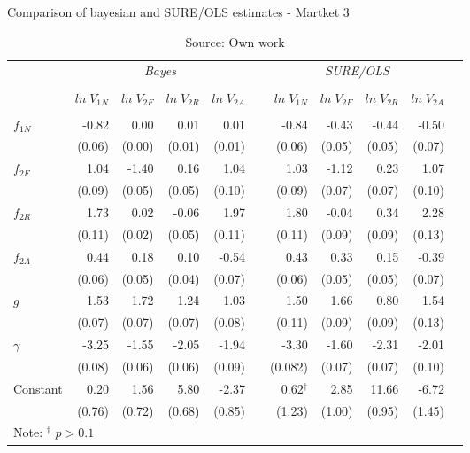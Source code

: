 \begin{table} [H]
\caption{Comparison of bayesian and SURE/OLS estimates - Martket 3}
\label{tbl:mkt3_T_SCOTYORK}
\centering
\begin{tabular}{lrrrrrrrrrr}
  \toprule 
 & \multicolumn{4}{c}{\textit{Bayes}} && \multicolumn{4}{c}{\textit{SURE/OLS}} \\ 
\cline{2-5} \cline{7-10} 
\\[-1.8ex] & $ln \; V_{1N}$ & $ln \; V_{2F}$ & $ln \; V_{2R}$ & $ln \; V_{2A}$ & & $ln \; V_{1N}$ & $ln \; V_{2F}$ & $ln \; V_{2R}$ & $ln \; V_{2A}$ \\ 
\hline \\[-1.8ex] 

$f_{1N}$ & -0.82  & 0.00   & 0.01   & 0.01   && -0.84 & \cellcolor{gray!25}-0.43 & \cellcolor{gray!25}-0.44 & \cellcolor{gray!25}-0.50 \\
         & (0.06) & (0.00) & (0.01) & (0.01) && (0.06) & (0.05) & (0.05) & (0.07) \\ [0.2cm]
$f_{2F}$ & 1.04   & -1.40  & 0.16   & 1.04   && 1.03 & -1.12 & 0.23 & 1.07 \\
         & (0.09) & (0.05) & (0.05) & (0.10) && (0.09) & (0.07) & (0.07) & (0.10) \\ [0.2cm]
$f_{2R}$ & 1.73   & 0.02   & -0.06  & 1.97   && 1.80 & \cellcolor{gray!25}-0.04 & \cellcolor{gray!25}0.34 & 2.28 \\ 
         & (0.11) & (0.02) & (0.05) & (0.11) && (0.11) & (0.09) & (0.09) & (0.13) \\ [0.2cm]
$f_{2A}$ & 0.44   & 0.18   & 0.10   & -0.54  && 0.43 & 0.33 & 0.15 & -0.39 \\
         & (0.06) & (0.05) & (0.04) & (0.07) && (0.06) & (0.05) & (0.05) & (0.07) \\ [0.2cm]
$g$      & 1.53   & 1.72   & 1.24   & 1.03   && 1.50 & 1.66 & 0.80 & 1.54 \\ 
         & (0.07) & (0.07) & (0.07) & (0.08) && (0.11) & (0.09) & (0.09) & (0.13) \\ [0.2cm]
$\gamma$ & -3.25  & -1.55  & -2.05  & -1.94  && -3.30 & -1.60 & -2.31 & -2.01 \\ 
         & (0.08) & (0.06) & (0.06) & (0.09) && (0.082) & (0.07) & (0.07) & (0.10) \\ [0.2cm]
Constant & 0.20   & 1.56   & 5.80   & -2.37  && 0.62$^{\dagger}$ & 2.85 & 11.66 & -6.72 \\ 
         & (0.76) & (0.72) & (0.68) & (0.85) && (1.23) & (1.00) & (0.95) & (1.45) \\ [0.2cm]
\bottomrule
\multicolumn{3}{l}{Note: $^{\dagger}$ $p>0.1$}
\end{tabular}
\caption*{Source: Own work}
\end{table}

